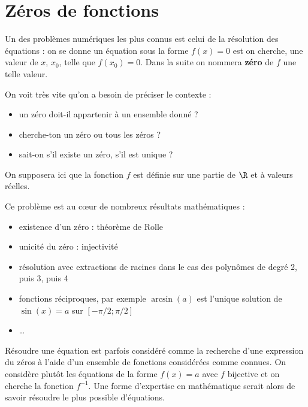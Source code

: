\chapter{Zéros de fonctions}\label{chap:zero}
\thispagestyle{empty}

Un des problèmes numériques les plus connus est celui de la résolution des équations : 
on se donne un équation sous la forme $f(x) = 0$ est on cherche, une valeur de $x$, $x_0$, telle que $f(x_0)=0$. Dans la suite on nommera {\bf zéro} de $f$ une telle valeur.

On voit très vite qu'on a besoin de préciser le contexte :
\begin{itemize}
    \item un zéro doit-il appartenir à un ensemble donné ?
    \item cherche-ton un zéro ou tous les zéros ?
    \item sait-on s'il existe un zéro, s'il est unique ?
\end{itemize}

On supposera ici que la fonction $f$ est définie sur une partie de $\R$ et à valeurs réelles.

Ce problème est au cœur de nombreux résultats mathématiques :

\begin{itemize}
    \item existence d'un zéro : théorème de Rolle
    \item unicité du zéro : injectivité
    \item résolution avec extractions de racines dans le cas des polynômes de degré 2, puis 3, puis 4
    \item fonctions réciproques, par exemple $\arcsin(a)$ est l'unique solution de $\sin(x) = a$ sur $[-\pi/2;\pi/2]$
    \item \dots
\end{itemize}

Résoudre une équation est parfois considéré comme la recherche d'une expression du zéros à l'aide d'un ensemble de fonctions considérées comme connues. On considère plutôt les équations de la forme $f(x)=a$ avec $f$ bijective et on cherche la fonction $f^{-1}$. Une forme d'expertise en mathématique serait alors de savoir résoudre le plus possible d'équations. 

